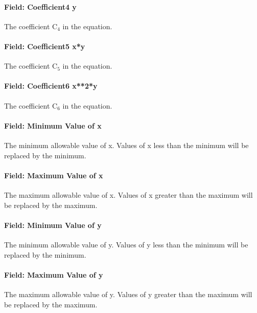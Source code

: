 \paragraph{Field: Coefficient4 y}\label{field-coefficient4-y-3}

The coefficient C\(_{4}\) in the equation.

\paragraph{Field: Coefficient5 x*y}\label{field-coefficient5-xy}

The coefficient C\(_{5}\) in the equation.

\paragraph{Field: Coefficient6 x**2*y}\label{field-coefficient6-x2y}

The coefficient C\(_{6}\) in the equation.

\paragraph{Field: Minimum Value of x}\label{field-minimum-value-of-x-10}

The minimum allowable value of x. Values of x less than the minimum will be replaced by the minimum.

\paragraph{Field: Maximum Value of x}\label{field-maximum-value-of-x-11}

The maximum allowable value of x. Values of x greater than the maximum will be replaced by the maximum.

\paragraph{Field: Minimum Value of y}\label{field-minimum-value-of-y-5}

The minimum allowable value of y. Values of y less than the minimum will be replaced by the minimum.

\paragraph{Field: Maximum Value of y}\label{field-maximum-value-of-y-5}

The maximum allowable value of y. Values of y greater than the maximum will be replaced by the maximum.

